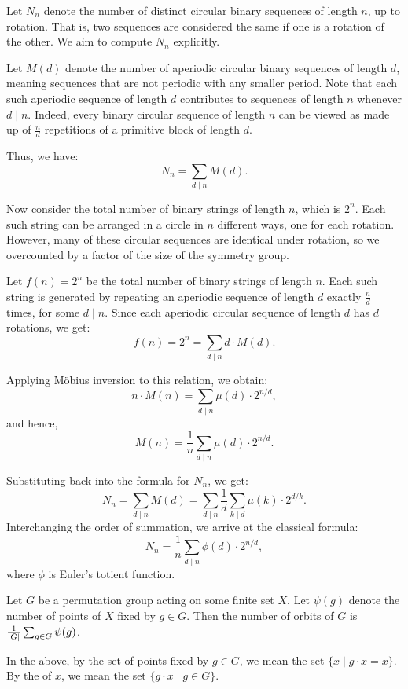 \begin{example}
Let $N_n$ denote the number of distinct circular binary sequences of length $n$, up to rotation. That is, two sequences are considered the same if one is a rotation of the other. We aim to compute $N_n$ explicitly.

Let $M(d)$ denote the number of aperiodic circular binary sequences of length $d$, meaning sequences that are not periodic with any smaller period. Note that each such aperiodic sequence of length $d$ contributes to sequences of length $n$ whenever $d \mid n$. Indeed, every binary circular sequence of length $n$ can be viewed as made up of $\frac{n}{d}$ repetitions of a primitive block of length $d$.

Thus, we have:
\[
N_n = \sum_{d \mid n} M(d).
\]

Now consider the total number of binary strings of length $n$, which is $2^n$. Each such string can be arranged in a circle in $n$ different ways, one for each rotation. However, many of these circular sequences are identical under rotation, so we overcounted by a factor of the size of the symmetry group.

Let $f(n) = 2^n$ be the total number of binary strings of length $n$. Each such string is generated by repeating an aperiodic sequence of length $d$ exactly $\frac{n}{d}$ times, for some $d \mid n$. Since each aperiodic circular sequence of length $d$ has $d$ rotations, we get:
\[
f(n) = 2^n = \sum_{d \mid n} d \cdot M(d).
\]

Applying M\"obius inversion to this relation, we obtain:
\[
n \cdot M(n) = \sum_{d \mid n} \mu(d) \cdot 2^{n/d},
\]
and hence,
\[
M(n) = \frac{1}{n} \sum_{d \mid n} \mu(d) \cdot 2^{n/d}.
\]

Substituting back into the formula for $N_n$, we get:
\[
N_n = \sum_{d \mid n} M(d) = \sum_{d \mid n} \frac{1}{d} \sum_{k \mid d} \mu(k) \cdot 2^{d/k}.
\]
Interchanging the order of summation, we arrive at the classical formula:
\[
N_n = \frac{1}{n} \sum_{d \mid n} \phi(d) \cdot 2^{n/d},
\]
where $\phi$ is Euler's totient function.
\end{example}


\begin{lemma}
    Let $G$ be a permutation group acting on some finite set $X$. Let $\psi(g)$ denote the number of points of $X$ fixed by $g \in G$. Then the number of orbits of $G$ is $\frac{1}{\left| G \right|} \sum_{g \in G} \psi(g)$.
\end{lemma}
In the above, by the set of points fixed by $g \in G$, we mean the set $\{x \mid g \cdot x = x\}$. By the  of $x$, we mean the set $\{g \cdot x \mid g \in G\}$.

